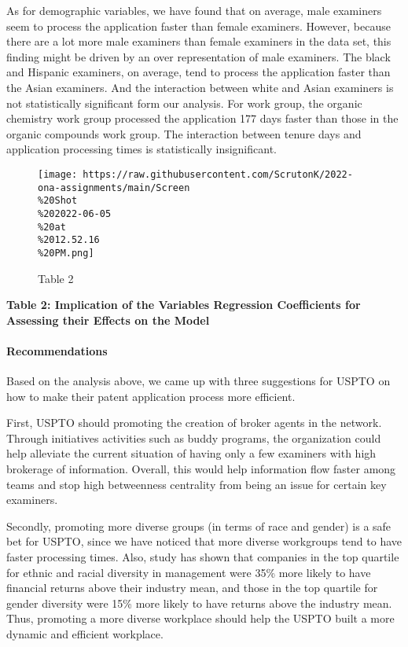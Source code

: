 \documentclass[
]{article}
\begin{document}
As for demographic variables, we have found that on average, male
examiners seem to process the application faster than female examiners.
However, because there are a lot more male examiners than female
examiners in the data set, this finding might be driven by an over
representation of male examiners. The black and Hispanic examiners, on
average, tend to process the application faster than the Asian
examiners. And the interaction between white and Asian examiners is not
statistically significant form our analysis. For work group, the organic
chemistry work group processed the application 177 days faster than
those in the organic compounds work group. The interaction between
tenure days and application processing times is statistically
insignificant.

\begin{figure}
\centering
\texttt{[image: https://raw.githubusercontent.com/ScrutonK/2022-ona-assignments/main/Screen\\\%20Shot\\\%202022-06-05\\\%20at\\\%2012.52.16\\\%20PM.png]}
\caption{Table 2}
\end{figure}

\textbf{Table 2: Implication of the Variables Regression Coefficients
for Assessing their Effects on the Model}

\hypertarget{recommendations}{%
\paragraph{Recommendations}\label{recommendations}}

Based on the analysis above, we came up with three suggestions for USPTO
on how to make their patent application process more efficient.

First, USPTO should promoting the creation of broker agents in the
network. Through initiatives activities such as buddy programs, the
organization could help alleviate the current situation of having only a
few examiners with high brokerage of information. Overall, this would
help information flow faster among teams and stop high betweenness
centrality from being an issue for certain key examiners.

Secondly, promoting more diverse groups (in terms of race and gender) is
a safe bet for USPTO, since we have noticed that more diverse workgroups
tend to have faster processing times. Also, study has shown that
companies in the top quartile for ethnic and racial diversity in
management were 35\% more likely to have financial returns above their
industry mean, and those in the top quartile for gender diversity were
15\% more likely to have returns above the industry mean. Thus,
promoting a more diverse workplace should help the USPTO built a more
dynamic and efficient workplace.
\end{document}
